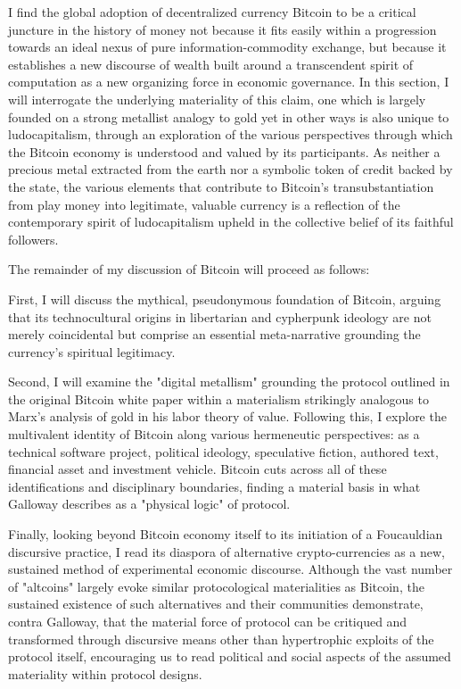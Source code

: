 I find the global adoption of decentralized currency Bitcoin to be a critical juncture in the history of money not because it fits easily within a progression towards an ideal nexus of pure information-commodity exchange, but because it establishes a new discourse of wealth built around a transcendent spirit of computation as a new organizing force in economic governance. In this section, I will interrogate the underlying materiality of this claim, one which is largely founded on a strong metallist analogy to gold yet in other ways is also unique to ludocapitalism, through an exploration of the various perspectives through which the Bitcoin economy is understood and valued by its participants. As neither a precious metal extracted from the earth nor a symbolic token of credit backed by the state, the various elements that contribute to Bitcoin's transubstantiation from play money into legitimate, valuable currency is a reflection of the contemporary spirit of ludocapitalism upheld in the collective belief of its faithful followers.

The remainder of my discussion of Bitcoin will proceed as follows:

First, I will discuss the mythical, pseudonymous foundation of Bitcoin, arguing that its technocultural origins in libertarian and cypherpunk ideology are not merely coincidental but comprise an essential meta-narrative grounding the currency's spiritual legitimacy.

Second, I will examine the "digital metallism" grounding the protocol outlined in the original Bitcoin white paper within a materialism strikingly analogous to Marx's analysis of gold in his labor theory of value. Following this, I explore the multivalent identity of Bitcoin along various hermeneutic perspectives: as a technical software project, political ideology, speculative fiction, authored text, financial asset and investment vehicle. Bitcoin cuts across all of these identifications and disciplinary boundaries, finding a material basis in what Galloway describes as a "physical logic" of protocol.

Finally, looking beyond Bitcoin economy itself to its initiation of a Foucauldian discursive practice, I read its diaspora of alternative crypto-currencies as a new, sustained method of experimental economic discourse. Although the vast number of "altcoins" largely evoke similar protocological materialities as Bitcoin, the sustained existence of such alternatives and their communities demonstrate, contra Galloway, that the material force of protocol can be critiqued and transformed through discursive means other than hypertrophic exploits of the protocol itself, encouraging us to read political and social aspects of the assumed materiality within protocol designs.

